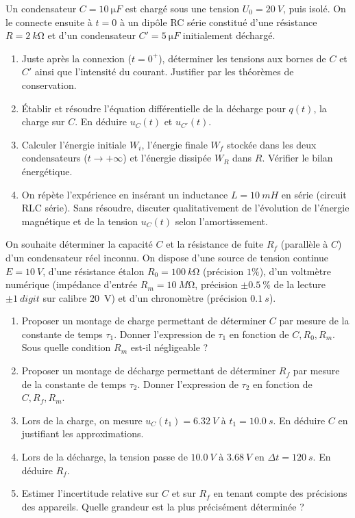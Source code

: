 \documentclass[11pt]{article}
\begin{document}
\begin{exercice}
Un condensateur $C = \SI{10}{\micro F}$ est chargé sous une tension $U_0 = \SI{20}{V}$, puis isolé. On le connecte ensuite à $t=0$ à un dipôle RC série constitué d'une résistance $R = \SI{2}{k\ohm}$ et d'un condensateur $C' = \SI{5}{\micro F}$ initialement déchargé.
\begin{enumerate}
    \item Juste après la connexion ($t=0^+$), déterminer les tensions aux bornes de $C$ et $C'$ ainsi que l'intensité du courant. Justifier par les théorèmes de conservation.
    \item Établir et résoudre l'équation différentielle de la décharge pour $q(t)$, la charge sur $C$. En déduire $u_C(t)$ et $u_{C'}(t)$.
    \item Calculer l'énergie initiale $W_i$, l'énergie finale $W_f$ stockée dans les deux condensateurs ($t \to +\infty$) et l'énergie dissipée $W_R$ dans $R$. Vérifier le bilan énergétique.
    \item On répète l'expérience en insérant un inductance $L = \SI{10}{mH}$ en série (circuit RLC série). Sans résoudre, discuter qualitativement de l'évolution de l'énergie magnétique et de la tension $u_C(t)$ selon l'amortissement.
\end{enumerate}
\end{exercice}

\begin{exercice}
On souhaite déterminer la capacité $C$ et la résistance de fuite $R_f$ (parallèle à $C$) d'un condensateur réel inconnu. On dispose d'une source de tension continue $E = \SI{10}{V}$, d'une résistance étalon $R_0 = \SI{100}{k\ohm}$ (précision $1\%$), d'un voltmètre numérique (impédance d'entrée $R_m = \SI{10}{M\ohm}$, précision $\pm \SI{0,5}{\%}$ de la lecture $\pm \SI{1}{digit}$ sur calibre \SI{20}{V}) et d'un chronomètre (précision $\SI{0,1}{s}$).
\begin{enumerate}
    \item Proposer un montage de charge permettant de déterminer $C$ par mesure de la constante de temps $\tau_1$. Donner l'expression de $\tau_1$ en fonction de $C, R_0, R_m$. Sous quelle condition $R_m$ est-il négligeable ?
    \item Proposer un montage de décharge permettant de déterminer $R_f$ par mesure de la constante de temps $\tau_2$. Donner l'expression de $\tau_2$ en fonction de $C, R_f, R_m$.
    \item Lors de la charge, on mesure $u_C(t_1) = \SI{6,32}{V}$ à $t_1 = \SI{10,0}{s}$. En déduire $C$ en justifiant les approximations.
    \item Lors de la décharge, la tension passe de $\SI{10,0}{V}$ à $\SI{3,68}{V}$ en $\Delta t = \SI{120}{s}$. En déduire $R_f$.
    \item Estimer l'incertitude relative sur $C$ et sur $R_f$ en tenant compte des précisions des appareils. Quelle grandeur est la plus précisément déterminée ?
\end{enumerate}
\end{exercice}
\end{document}
